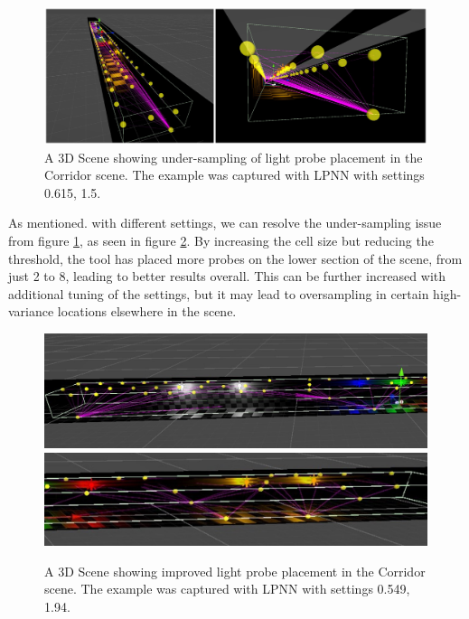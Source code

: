 \begin{figure}[h]
	\centering
	\includegraphics[scale=0.207]{Graphics/results/concats/comparison3.png}
	\caption{A 3D Scene showing under-sampling of light probe placement in the Corridor scene. The example was captured with LPNN with settings 0.615, 1.5.}
	\label{fig:comp3}
\end{figure}

As mentioned. with different settings, we can resolve the under-sampling issue from figure \ref{fig:comp3}, as seen in figure \ref{fig:comp4}. By increasing the cell size but reducing the threshold, the tool has placed more probes on the lower section of the scene, from just 2 to 8, leading to better results overall. This can be further increased with additional tuning of the settings, but it may lead to oversampling in certain high-variance locations elsewhere in the scene.

\begin{figure}[h]
	\centering
	\includegraphics[scale=0.32]{Graphics/results/corridor_0.549_1.94_E2.jpg}
	\includegraphics[scale=0.4623]{Graphics/results/corridor_0.549_1.94_E3.jpg}
	\caption{A 3D Scene showing improved light probe placement in the Corridor scene. The example was captured with LPNN with settings 0.549, 1.94.}
	\label{fig:comp4}
\end{figure}





